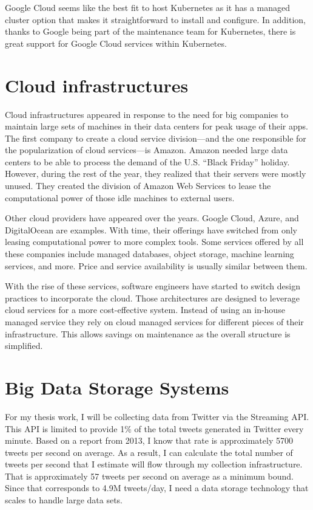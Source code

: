 Google Cloud seems like the best fit to host Kubernetes as it has a managed cluster option that makes it straightforward to install and configure. In addition, thanks to Google being part of the maintenance team for Kubernetes, there is great support for Google Cloud services within Kubernetes.

\section{Cloud infrastructures}

Cloud infrastructures appeared in response to the need for big companies to maintain large sets of machines in their data centers for peak usage of their apps. The first company to create a cloud service division---and the one responsible for the popularization of cloud services---is Amazon. Amazon needed large data centers to be able to process the demand of the U.S. ``Black Friday'' holiday. However, during the rest of the year, they realized that their servers were mostly unused. They created the division of Amazon Web Services  to lease the computational power of those idle machines to external users.

Other cloud providers have appeared over the years. Google Cloud, Azure, and DigitalOcean are examples. With time, their offerings have switched from only leasing computational power to more complex tools. Some services offered by all these companies include managed databases, object storage, machine learning services, and more. Price and service availability is usually similar between them. 

With the rise of these services, software engineers have started to switch design practices to incorporate the cloud. Those architectures are designed to leverage cloud services for a more cost-effective system. Instead of using an in-house managed service they rely on cloud managed services for different pieces of their infrastructure. This allows savings on maintenance as the overall structure is simplified.

\section{Big Data Storage Systems}

For my thesis work, I will be collecting data from Twitter via the Streaming API. This API is limited to provide 1\% of the total tweets generated in Twitter every minute. Based on a report from 2013\cite{tweetsRecord}, I know that rate is approximately 5700 tweets per second on average. As a result, I can calculate the total number of tweets per second that I estimate will flow through my collection infrastructure. That is approximately 57 tweets per second on average as a minimum bound. Since that corresponds to 4.9M tweets/day, I need a data storage technology that scales to handle large data sets. 

